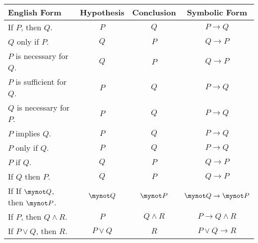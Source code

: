 \documentclass[11pt]{article}
\begin{document}
\vskip20pt
\begin{center}
\begin{tabular}{|l|c|c|c|}
  \hline
  \textbf{English Form}  &  \textbf{Hypothesis}  &  \textbf{Conclusion} &  \textbf{Symbolic Form} \\ \hline
  If $P$, then $Q$.          &  $P$  &  $Q$  &  $P \to Q$  \\ \hline
  $Q$ only if $P$.           &  $Q$  &  $P$  &  $Q \to P$  \\ \hline
  $P$ is necessary for $Q$.  &  $Q$  &  $P$  &  $Q \to P$           \\ \hline
  $P$ is sufficient for $Q$. &  $P$  &  $Q$  &  $P \to Q$   \\ \hline
  $Q$ is necessary for $P$.  &  $P$  &  $Q$  &  $P \to Q$   \\ \hline
  $P$ implies $Q$.           &  $P$  &  $Q$  &  $P \to Q$   \\ \hline
  $P$ only if $Q$.           &  $P$  &  $Q$  &  $P \to Q$   \\ \hline
  $P$ if $Q$.                &  $Q$  &  $P$  &  $Q \to P$  \\ \hline
  If $Q$ then $P$.           &  $Q$  &  $P$  &  $Q \to P$  \\ \hline
  If If  $\mynot  Q$, then $\mynot  P$. & $\mynot Q$  & $\mynot P$  &  
$\mynot Q \to \mynot P$           \\ \hline
  If $P$, then $Q \wedge R$. &  $P$     &  $Q \wedge R$     &  $P \to Q \wedge R$       \\ \hline
  If $P \vee Q$, then $R$.   &  $P \vee Q$     &  $R$     &   $P \vee Q \to R$          \\ \hline
\end{tabular}
\end{center}
\end{document}

